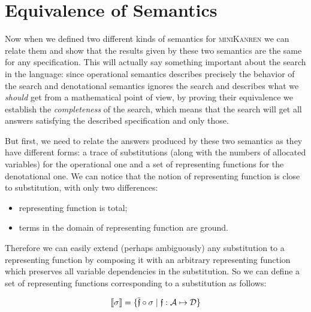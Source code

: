 \section{Equivalence of Semantics}
\label{equivalence}

Now when we defined two different kinds of semantics for \textsc{miniKanren} we can relate them and show that the results given by these two semantics are the same for any specification.
This will actually say something important about the search in the language: since operational semantics describes precisely the behavior of the search and denotational semantics
ignores the search and describes what we \emph{should} get from a mathematical point of view, by proving their equivalence we establish the \emph{completeness} of the search, which
means that the search will get all answers satisfying the described specification and only those.

But first, we need to relate the answers produced by these two semantics as they have different forms: a trace of substitutions (along with the numbers of allocated variables)
for the operational one and a set of representing functions for the denotational one. We can notice that the notion of representing function is close to substitution, with only two differences:

\begin{itemize}
\item representing function is total;
\item terms in the domain of representing function are ground.
\end{itemize}

Therefore we can easily extend (perhaps ambiguously) any substitution to a representing function by composing it with an arbitrary representing function which preserves
all variable dependencies in the substitution. So we can define a set of representing functions corresponding to a substitution as follows:

\[
\llbracket{\sigma}\rrbracket = \{\overline{\mathfrak f} \circ \sigma \mid \mathfrak{f}:\mathcal{A}\mapsto\mathcal{D}\}
\]

\begin{comment}
In \textsc{Coq} this notion boils down to the following definition:

\begin{lstlisting}[language=Coq]
   Definition in_denotational_sem_subst
     (s : subst) (f : repr_fun) : Prop :=
       exists (f' : repr_fun),
         repr_fun_eq (subst_repr_fun_compose s f') f.
\end{lstlisting}

where ``\lstinline[language=Coq]|repr_fun_eq|'' stands for representing functions extensional equality, ``\lstinline[language=Coq]|subst_repr_fun_compose|''~---
for a composition of a substitution and a representing function.
\end{comment}

